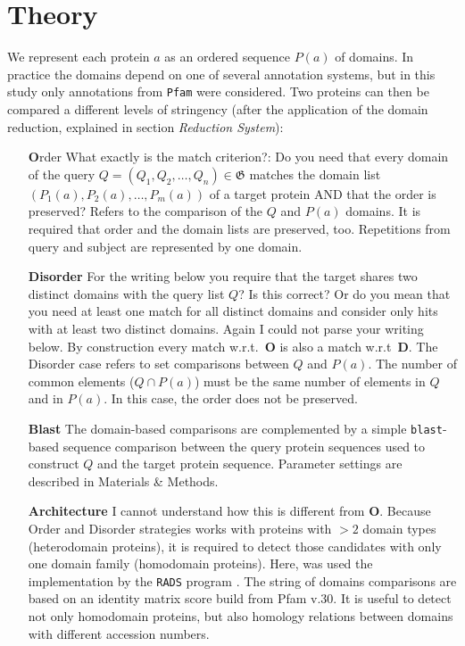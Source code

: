 \documentclass[11pt]{article}
\newcommand{\TODO}[1]{\begingroup\color{red}#1\endgroup}
\newcommand{\CAVH}[1]{\begingroup\color{green}#1\endgroup}
\begin{document}
\section*{Theory}

We represent each protein $a$ as an ordered sequence $P(a)$ of domains. In
practice the domains depend on one of several annotation systems, \CAVH{but 
in this study only annotations from \texttt{Pfam} were considered}. Two 
proteins can then be compared a different levels of stringency (\CAVH{after the 
application of the domain reduction, explained in section \textit{Reduction 
System}}):
\begin{itemize}
\item[\textbf{O}rder] \TODO{What exactly is the match criterion?: Do you need
    that every domain of the query
    $Q=(Q_1,Q_2,\dots,Q_n)\in \boldsymbol{\mathfrak{G}}$ matches the
    domain list $(P_1(a),P_2(a),\dots,P_m(a))$ of a target protein AND that
    the order is preserved? }
    \CAVH{Refers to the comparison of the $Q$ and $P(a)$ domains. It is 
required that order and the domain lists are preserved, too. Repetitions from 
query and subject are represented by one domain.}
\item[\textbf{Disorder}] \TODO{For the writing below you require that the target
    shares two distinct domains with the query list $Q$? Is this correct?
    Or do you mean that you need at least one match for all distinct
    domains and consider only hits with at least two distinct
    domains. Again I could not parse your writing below.} By construction
  every match w.r.t.\ \textbf{O} is also a match w.r.t\ \textbf{D}.
  \CAVH{The Disorder case refers to set comparisons between $Q$ and $P(a)$. 
The number of common elements ($Q \cap P(a)$) must be the same number of 
elements in $Q$ and in $P(a)$. In this case, the order does not be 
preserved.} 
\item[\textbf{Blast}] The domain-based comparisons are complemented by a simple
  \texttt{blast}-based sequence comparison between the query protein
  sequences used to construct $Q$ and the target protein
  sequence. Parameter settings are described in Materials \& Methods.
\item[\textbf{Architecture}] \TODO{I cannot understand how this is different 
from \textbf{O}.} \CAVH{Because Order and Disorder strategies works with 
proteins with $> 2$ domain types (heterodomain proteins), it is required to 
detect those candidates with only one domain family (homodomain proteins). 
Here, was used the implementation by the \texttt{RADS} program  
\cite{Terrapon:2014}. The string of domains comparisons are based on 
an identity matrix score build from Pfam v.30. It is useful to detect not only 
homodomain proteins, but also homology relations between domains with different 
accession numbers.}  
\end{itemize}
\end{document}
